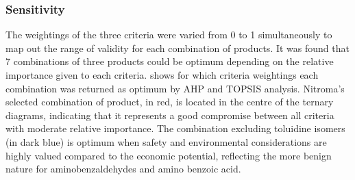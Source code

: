 
\subsubsection{Sensitivity}

The weightings of the three criteria were varied from 0 to 1 simultaneously to map out the range of validity for each combination of products. It was found that 7 combinations of three products could be optimum depending on the relative importance given to each criteria.  shows for which criteria weightings each combination was returned as optimum by AHP and TOPSIS analysis. Nitroma's selected combination of product, in red, is located in the centre of the ternary diagrams, indicating that it represents a good compromise between all criteria with moderate relative importance. The combination excluding toluidine isomers (in dark blue) is optimum when safety and environmental considerations are highly valued compared to the economic potential, reflecting the more benign nature for aminobenzaldehydes and amino benzoic acid. 

